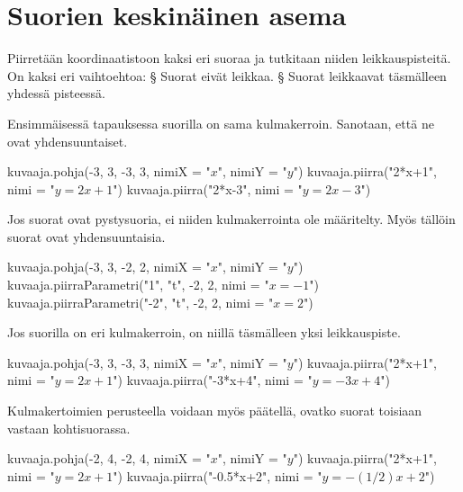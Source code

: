 \section{Suorien keskinäinen asema}


Piirretään koordinaatistoon kaksi eri suoraa ja tutkitaan niiden leikkauspisteitä.
On kaksi eri vaihtoehtoa:
\vaiheet
 § Suorat eivät leikkaa.
 § Suorat leikkaavat täsmälleen yhdessä pisteessä.
\loppu

Ensimmäisessä tapauksessa suorilla on sama kulmakerroin. Sanotaan, että ne ovat yhdensuuntaiset.

\begin{kuva}
    kuvaaja.pohja(-3, 3, -3, 3, nimiX = "$x$", nimiY = "$y$")
    kuvaaja.piirra("2*x+1", nimi = "$y=2x+1$")
    kuvaaja.piirra("2*x-3", nimi = "$y=2x-3$")
\end{kuva}

Jos suorat ovat pystysuoria, ei niiden kulmakerrointa ole määritelty. Myös tällöin suorat ovat yhdensuuntaisia.

\begin{kuva}
    kuvaaja.pohja(-3, 3, -2, 2, nimiX = "$x$", nimiY = "$y$")
    kuvaaja.piirraParametri("1", "t", -2, 2, nimi = "$x=-1$")
    kuvaaja.piirraParametri("-2", "t", -2, 2, nimi = "$x=2$")
\end{kuva}


Jos suorilla on eri kulmakerroin, on niillä täsmälleen yksi leikkauspiste. 

\begin{kuva}
    kuvaaja.pohja(-3, 3, -3, 3, nimiX = "$x$", nimiY = "$y$")
    kuvaaja.piirra("2*x+1", nimi = "$y=2x+1$")
    kuvaaja.piirra("-3*x+4", nimi = "$y=-3x+4$")
\end{kuva}

Kulmakertoimien perusteella voidaan myös päätellä, ovatko suorat toisiaan vastaan kohtisuorassa.

\begin{kuva}
    kuvaaja.pohja(-2, 4, -2, 4, nimiX = "$x$", nimiY = "$y$")
    kuvaaja.piirra("2*x+1", nimi = "$y=2x+1$")
    kuvaaja.piirra("-0.5*x+2", nimi = "$y=-(1/2)x+2$")
\end{kuva}

